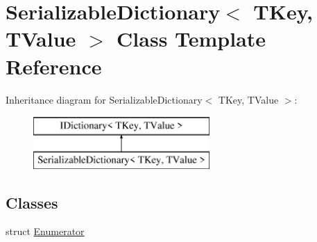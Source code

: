 \hypertarget{class_serializable_dictionary}{}\section{Serializable\+Dictionary$<$ T\+Key, T\+Value $>$ Class Template Reference}
\label{class_serializable_dictionary}
Inheritance diagram for Serializable\+Dictionary$<$ T\+Key, T\+Value $>$\+:\begin{figure}[H]
\begin{center}
\leavevmode
\includegraphics[height=2.000000cm]{class_serializable_dictionary}
\end{center}
\end{figure}
\subsection*{Classes}
\begin{DoxyCompactItemize}
\item 
struct \hyperlink{struct_serializable_dictionary_1_1_enumerator}{Enumerator}
\end{DoxyCompactItemize}
